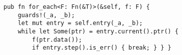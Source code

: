 \begin{lstlisting}[caption=Implementation of \code{List::for_each} using the \code{Entry} API.]
pub fn for_each<F: Fn(&T)>(&self, f: F) {
    guards!(_a, _b);
    let mut entry = self.entry(_a, _b);
    while let Some(ptr) = entry.current().ptr() {
        f(ptr.data());
        if entry.step().is_err() { break; } } }
\end{lstlisting}
